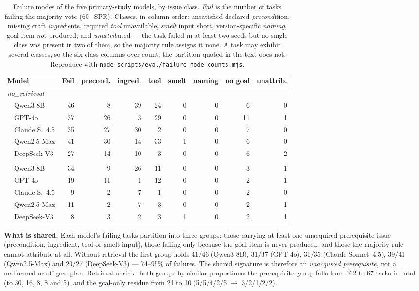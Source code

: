 \documentclass[letterpaper]{article} %
\begin{document}
\begin{table}[htbp]
\caption{Failure modes of the five primary-study models, by issue class.
\emph{Fail} is the number of tasks failing the majority vote (60$-$SPR).
Classes, in column order: unsatisfied declared \emph{precond}ition,
missing craft \emph{ingred}ients, required \emph{tool} unavailable,
\emph{smelt} input short, version-specific \emph{naming}, goal item
\emph{no}t produced, and \emph{unattrib}uted --- the task failed in at least
two seeds but no single class was present in two of them, so the majority
rule assigns it none.  A
task may exhibit several classes, so the six class columns over-count; the
partition quoted in the text does not.
Reproduce with \texttt{node scripts/eval/failure\_mode\_counts.mjs}.}
\label{tab:failmodes}
\footnotesize\setlength{\tabcolsep}{4pt}
\centering
\begin{tabular}{lrrrrrrrr}
\toprule
Model & Fail & precond. & ingred. & tool & smelt & naming & no goal & unattrib. \\
\midrule
\multicolumn{9}{l}{\emph{no\_retrieval}} \\
~~Qwen3-8B & 46 & 8 & 39 & 24 & 0 & 0 & 6 & 0 \\
~~GPT-4o & 37 & 26 & 3 & 29 & 0 & 0 & 11 & 1 \\
~~Claude S.\ 4.5 & 35 & 27 & 30 & 2 & 0 & 0 & 7 & 0 \\
~~Qwen2.5-Max & 41 & 30 & 14 & 33 & 1 & 0 & 6 & 0 \\
~~DeepSeek-V3 & 27 & 14 & 10 & 3 & 0 & 0 & 6 & 2 \\
\addlinespace
\multicolumn{9}{l}{\emph{saer\_cold}} \\
~~Qwen3-8B & 34 & 9 & 26 & 11 & 0 & 0 & 3 & 1 \\
~~GPT-4o & 19 & 11 & 1 & 12 & 0 & 0 & 2 & 1 \\
~~Claude S.\ 4.5 & 9 & 2 & 7 & 1 & 0 & 0 & 2 & 0 \\
~~Qwen2.5-Max & 11 & 2 & 7 & 3 & 0 & 0 & 2 & 1 \\
~~DeepSeek-V3 & 8 & 3 & 2 & 3 & 1 & 0 & 2 & 1 \\
\bottomrule
\end{tabular}
\end{table}

\textbf{What is shared.}  Each model's failing tasks partition into three
groups: those carrying at least one unacquired-prerequisite issue
(precondition, ingredient, tool or smelt-input), those failing only because
the goal item is never produced, and those the majority rule cannot attribute
at all.  Without retrieval the first group holds 41/46 (Qwen3-8B), 31/37
(GPT-4o), 31/35 (Claude Sonnet~4.5), 39/41 (Qwen2.5-Max) and 20/27
(DeepSeek-V3) --- 74--95\% of failures.  The shared
signature is therefore an \emph{unacquired prerequisite}, not a malformed
or off-goal plan.  Retrieval shrinks both groups by similar proportions: the prerequisite group
falls from 162 to 67 tasks in total (to 30, 16, 8, 8 and 5), and the goal-only
residue from 21 to 10 (5/5/4/2/5 $\to$ 3/2/1/2/2).
\end{document}
